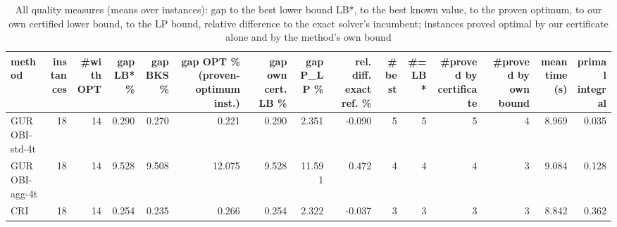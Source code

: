 \begin{table}[htbp]
\centering
\small
\caption{All quality measures (means over instances): gap to the best lower bound LB*, to the best known value, to the proven optimum, to our own certified lower bound, to the LP bound, relative difference to the exact solver's incumbent; instances proved optimal by our certificate alone and by the method's own bound}
\label{tab:E7_gurobi_threads_b10_all_metrics}
\begin{tabular}{lrrrrrrrrrrrrrr}
\toprule
method & instances & \#with OPT & gap LB* \% & gap BKS \% & gap OPT \% (proven-optimum inst.) & gap own cert. LB \% & gap P\_LP \% & rel. diff. exact ref. \% & \#best & \#= LB* & \#proved by certificate & \#proved by own bound & mean time (s) & primal integral \\
\midrule
GUROBI-std-4t & 18 & 14 & 0.290 & 0.270 & 0.221 & 0.290 & 2.351 & -0.090 & 5 & 5 & 5 & 4 & 8.969 & 0.035 \\
GUROBI-agg-4t & 18 & 14 & 9.528 & 9.508 & 12.075 & 9.528 & 11.591 & 0.472 & 4 & 4 & 4 & 3 & 9.084 & 0.128 \\
CRI & 18 & 14 & 0.254 & 0.235 & 0.266 & 0.254 & 2.322 & -0.037 & 3 & 3 & 3 & 3 & 8.842 & 0.362 \\
\bottomrule
\end{tabular}
\end{table}
